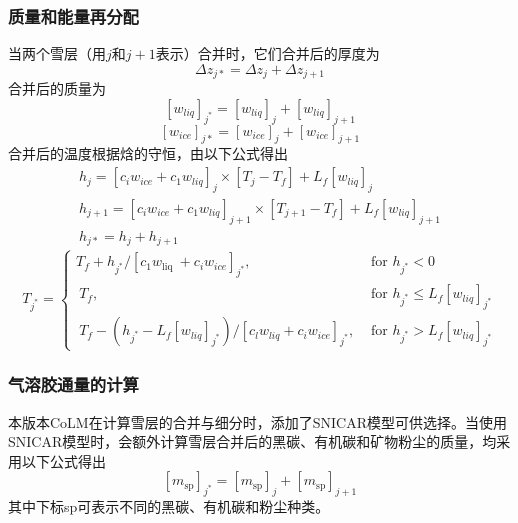 \subsubsection{质量和能量再分配}

当两个雪层（用$j$和$j+1$表示）合并时，它们合并后的厚度为
\begin{equation}
\Delta {z}_{{j} *}=\Delta {z}_{{j}}+\Delta {z}_{{j}+1}
\end{equation}
合并后的质量为
\begin{equation}
\left[{w}_{{liq}}\right]_{{j}^{*}}=\left[{w}_{{liq}}\right]_{{j}}+\left[{w}_{{liq}}\right]_{{j}+1}
\end{equation}
\begin{equation}
\left[{w}_{ {ice }}\right]_{j *}=\left[{w}_{ {ice }}\right]_{j}+\left[{w}_{ {ice }}\right]_{j+1}
\end{equation}
合并后的温度根据焓的守恒，由以下公式得出
\begin{equation}
\begin{array}{l}h_{j}=\left[c_{i} w_{ {ice }}+c_{1} w_{ {liq }}\right]_{j} \times\left[T_{j}-T_{f}\right]+L_{f}\left[w_{ {liq }}\right]_{j} \\ h_{j+1}=\left[c_{i} w_{ {ice }}+c_{1} w_{ {liq }}\right]_{j+1} \times\left[T_{j+1}-T_{f}\right]+L_{f}\left[w_{ {liq }}\right]_{j+1} \\ h_{j *}=h_{j}+h_{j+1}\end{array}
\end{equation}
\begin{equation}
{T}_{{j}^{*}}=\left\{\begin{array}{ll}{T}_{{f}}+{h}_{{j}^{*}} /\left[{c}_{1} {w}_{\text {liq }}+{c}_{{i}} {w}_{{ice}}\right]_{{j}^{*}}, & \text { for } {h}_{{j}^{*}}<0 \\ {~T}_{{f}}, & \text { for } {h}_{{j}^{*}} \leq {L}_{{f}}\left[{w}_{{liq}}\right]_{{j}^{*}} \\ {~T}_{{f}}-\left({h}_{{j}^{*}}-{L}_{{f}}\left[{w}_{{liq}}\right]_{{j}^{*}}\right) /\left[{c}_{{l}} {w}_{{liq}}+{c}_{{i}} {w}_{{ice}}\right]_{{j}^{*}}, & \text { for } {h}_{{j}^{*}}>{L}_{{f}}\left[{w}_{{liq}}\right]_{{j}^{*}}\end{array}\right.
\end{equation}


\subsubsection{气溶胶通量的计算}

本版本CoLM在计算雪层的合并与细分时，添加了SNICAR模型可供选择。当使用SNICAR模型时，会额外计算雪层合并后的黑碳、有机碳和矿物粉尘的质量，均采用以下公式得出
\begin{equation}
\left[m_{\mathrm{sp}}\right]_{j^{*}}=\left[m_{\mathrm{sp}}\right]_{j}+\left[m_{\mathrm{sp}}\right]_{j+1}
\end{equation}
其中下标sp可表示不同的黑碳、有机碳和粉尘种类。
